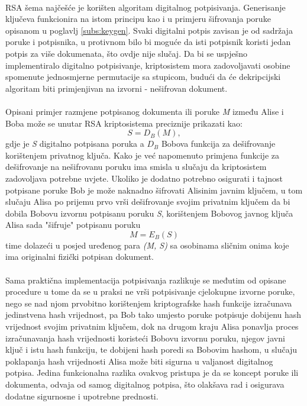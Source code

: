 \paragraph*{}
RSA šema najčešće je korišten algoritam digitalnog potpisivanja. Generisanje ključeva funkcionira na istom principu kao i u primjeru šifrovanja poruke opisanom u poglavlj \ref{subs:keygen}. Svaki digitalni potpis zavisan je od sadržaja poruke i potpisnika, u protivnom bilo bi moguće da isti potpisnik koristi jedan potpis za više dokumenata, što ovdje nije slučaj. Da bi se uspješno implementiralo digitalno potpisivanje, kriptosistem mora zadovoljavati osobine spomenute jednosmjerne permutacije sa stupicom, budući da će dekripcijski algoritam biti primjenjivan na izvorni - nešifrovan dokument.

\paragraph*{}
Opisani primjer razmjene potpisanog dokumenta ili poruke \textit{M} između Alise i Boba može se unutar RSA kriptosistema preciznije prikazati kao: \[S = D_{B}(M),\] gdje je \textit{S} digitalno potpisana poruka a \(D_{B}\) Bobova funkcija za dešifrovanje korištenjem privatnog ključa. Kako je već napomenuto primjena funkcije za dešifrovanje na nešifrovanu poruku ima smisla u slučaju da kriptosistem zadovoljava potrebne uvjete. Ukoliko je dodatno potrebno osigurati i tajnost potpisane poruke Bob je može naknadno šifrovati Alisinim javnim ključem, u tom slučaju Alisa po prijemu prvo vrši dešifrovanje svojim privatnim ključem da bi dobila Bobovu izvornu potpisanu poruku \textit{S}, korištenjem Bobovog javnog ključa Alisa sada "šifruje" potpisanu poruku \[M = E_{B}(S)\] time dolazeći u posjed uređenog para \textit{(M, S)} sa osobinama sličnim onima koje ima originalni fizički potpisan dokument.

\paragraph*{}
Sama praktična implementacija potpisivanja razlikuje se međutim od opisane procedure u tome da se u praksi ne vrši potpisivanje cjelokupne izvorne poruke, nego se nad njom prvobitno korištenjem kriptografske hash funkcije izračunava jedinstvena hash vrijednost, pa Bob tako umjesto poruke potpisuje dobijenu hash vrijednost svojim privatnim ključem, dok na drugom kraju Alisa ponavlja proces izračunavanja hash vrijednosti koristeći Bobovu izvornu poruku, njegov javni ključ i istu hash funkciju, te dobijeni hash poredi sa Bobovim hashom, u slučaju poklapanja hash vrijednosti Alisa može biti sigurna u valjanost digitalnog potpisa. Jedina funkcionalna razlika ovakvog pristupa je da se koncept poruke ili dokumenta, odvaja od samog digitalnog potpisa, što olakšava rad i osigurava dodatne sigurnosne i upotrebne prednosti.

